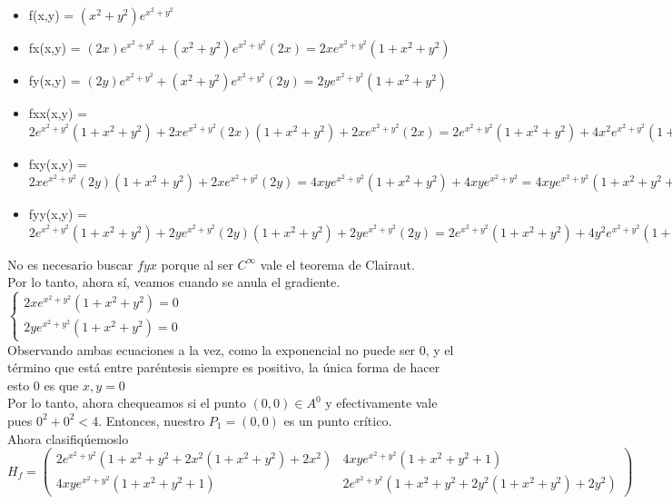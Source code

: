 \documentclass[10pt,a4paper]{article}
\begin{document}
\begin{itemize}
    \item f(x,y) = $(x^{2} + y^{2})e^{x^{2} + y^{2}}$
    \item fx(x,y) = $(2x)e^{x^{2} + y^{2}} + (x^{2} + y^{2})e^{x^{2} + y^{2}}(2x) = 2xe^{x^{2} + y^{2}}(1+x^{2} + y^{2})$
    \item fy(x,y) = $(2y)e^{x^{2} + y^{2}}+(x^{2} + y^{2})e^{x^{2} + y^{2}}(2y) = 2ye^{x^{2} + y^{2}}(1+x^{2} + y^{2})$
    \item fxx(x,y) = $2e^{x^{2} + y^{2}}(1+x^{2}+y^{2}) + 2xe^{x^{2} + y^{2}}(2x)(1+x^{2}+y^{2}) + 2xe^{x^{2} + y^{2}}(2x) = 2e^{x^{2} + y^{2}}(1+x^{2}+y^{2}) + 4x^{2}e^{x^{2} + y^{2}}(1+x^{2} + y^{2}) + 4x^{2}e^{x^{2} + y^{2}} = 2e^{x^{2}+y^{2}}(1+x^{2}+y^{2} + 2x^{2}(1+x^{2}+y^{2}) + 2x^{2}) $
    \item fxy(x,y) = $2xe^{x^{2} + y^{2}}(2y)(1+x^{2}+y^{2}) + 2xe^{x^{2} + y^{2}}(2y) = 4xye^{x^{2} + y^{2}}(1+x^{2}+y^{2})+4xye^{x^{2} + y^{2}} = 4xye^{x^{2} + y^{2}}(1+x^{2}+y^{2} + 1)  $
    \item fyy(x,y) = $2e^{x^{2} + y^{2}}(1+x^{2} + y^{2}) + 2ye^{x^{2} + y^{2}}(2y)(1+x^{2}+y^{2}) + 2ye^{x^{2} + y^{2}}(2y) = 2e^{x^{2} + y^{2}}(1+x^{2}+y^{2})+4y^{2}e^{x^{2} + y^{2}}(1+x^{2}+y^{2}) + 4y^{2}e^{x^{2} + y^{2}} = 2e^{x^{2} + y^{2}}(1+x^{2}+y^{2} + 2y^{2}(1+x^{2}+y^{2}) + 2y^{2})$
\end{itemize}
No es necesario buscar $fyx$ porque al ser $C^{\infty}$ vale el teorema de Clairaut. \\
Por lo tanto, ahora sí, veamos cuando se anula el gradiente. \\
$
\begin{cases}
    2x{e^{x^{2} + y^{2}}(1+x^{2}+y^{2})} = 0 \\
    2y{e^{x^{2} + y^{2}}(1+x^{2}+y^{2})} = 0
\end{cases}
$ \\
Observando ambas ecuaciones a la vez, como la exponencial no puede ser 0, y el término que está entre paréntesis siempre es positivo, la única forma de hacer esto 0 es que $x, y = 0$ \\
Por lo tanto, ahora chequeamos si el punto $(0,0) \in A^{0}$ y efectivamente vale pues $0^{2} + 0^{2} < 4$. Entonces, nuestro $P_{1} = (0,0)$ es un punto crítico. \\
Ahora clasifiqúemoslo
$H_{f} = 
\begin{pmatrix}
    2e^{x^{2}+y^{2}}(1+x^{2}+y^{2} + 2x^{2}(1+x^{2}+y^{2}) + 2x^{2}) & 4xye^{x^{2} + y^{2}}(1+x^{2}+y^{2} + 1) \\
    4xye^{x^{2} + y^{2}}(1+x^{2}+y^{2} + 1) & 2e^{x^{2} + y^{2}}(1+x^{2}+y^{2} + 2y^{2}(1+x^{2}+y^{2}) + 2y^{2}) 
\end{pmatrix}$
 
\end{document}
